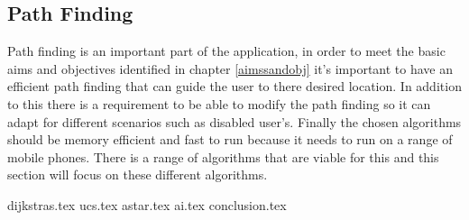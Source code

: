 \subsection{Path Finding}
Path finding is an important part of the application, in order to meet the basic aims and objectives identified in chapter \ref{aimssandobj} it's important to have an efficient path finding that can guide the user to there desired location. In addition to this there is a requirement to be able to modify the path finding so it can adapt for different scenarios such as disabled user's. Finally the chosen algorithms should be memory efficient and fast to run because it needs to run on a range of mobile phones. There is a range of algorithms that are viable for this and this section will focus on these different algorithms.

{dijkstras.tex}
{ucs.tex}
{astar.tex}
{ai.tex}
{conclusion.tex}